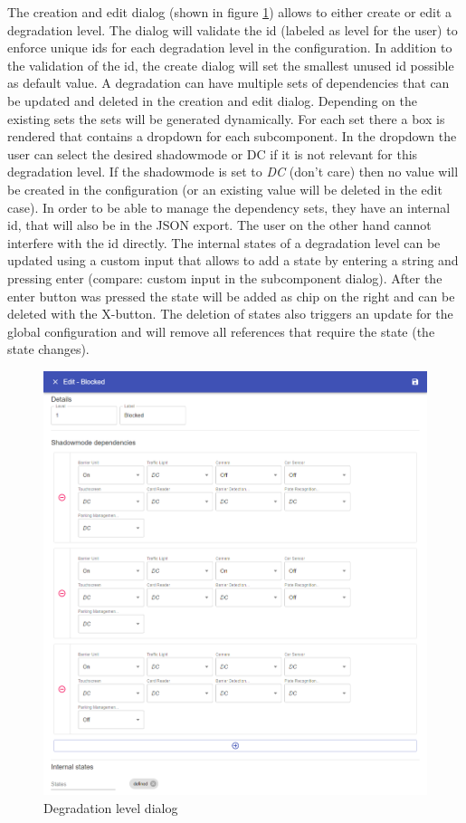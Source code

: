 The creation and edit dialog (shown in figure \ref{fig:degradation_level_dialog}) allows to either create or edit a degradation level. The dialog will validate the id (labeled as level for the user) to enforce unique ids for each degradation level in the configuration. In addition to the validation of the id, the create dialog will set the smallest unused id possible as default value. 
A degradation can have multiple sets of dependencies that can be updated and deleted in the creation and edit dialog. Depending on the existing sets the sets will be generated dynamically.
For each set there a box is rendered that contains a dropdown for each subcomponent. In the dropdown the user can select the desired shadowmode or DC if it is not relevant for this degradation level. If the shadowmode is set to \textit{DC} (don't care) then no value will be created in the configuration (or an existing value will be deleted in the edit case). In order to be able to manage the dependency sets, they have an internal id, that will also be in the JSON export. The user on the other hand cannot interfere with the id directly. The internal states of a degradation level can be updated using a custom input that allows to add a state by entering a string and pressing enter (compare: custom input in the subcomponent dialog). After the enter button was pressed the state will be added as chip on the right and can be deleted with the X-button. The deletion of states also triggers an update for the global configuration and will remove all references that require the state (the state changes).

\begin{figure}[ht]
    \centering
    \includegraphics[width=\textwidth]{img/degradation_level_dialog.png}
    \caption{Degradation level dialog}
    \label{fig:degradation_level_dialog}
\end{figure}

